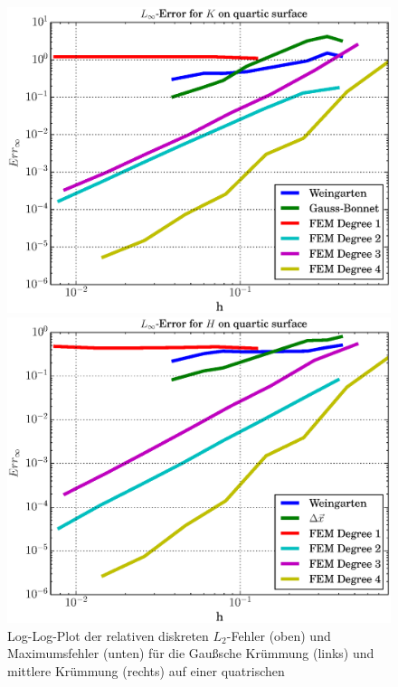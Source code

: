 \begin{figure}
\begin{minipage}[t]{0.49\textwidth}
       \centering\includegraphics[width=\textwidth]{bilder/Curvature/heineB/ErrKMax.eps}
    \end{minipage}\hfill
    \begin{minipage}[t]{0.49\textwidth}
       \centering\includegraphics[width=\textwidth]{bilder/Curvature/heineB/ErrHMax.eps}
    \end{minipage}
    \caption[Fehlerplot (Krümmungen auf quatrischer Oberfläche)]
            {Log-Log-Plot der relativen diskreten \( L_{2} \)-Fehler (oben) und Maximumsfehler (unten) 
             für die Gaußsche Krümmung (links) und mittlere Krümmung (rechts) auf einer quatrischen
}
\end{figure}
